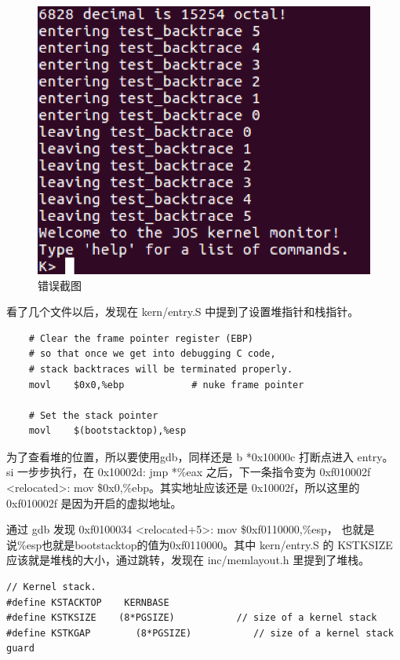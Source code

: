 \begin{ExerciseList}
\begin{figure}[H]
  \centering
  \includegraphics[width=6in]{figures/lab1/printf.png}
  \caption{错误截图}\label{fig:lab1:printf}
\end{figure}


看了几个文件以后，发现在 kern/entry.S 中提到了设置堆指针和栈指针。

\begin{verbatim}
    # Clear the frame pointer register (EBP)
    # so that once we get into debugging C code,
    # stack backtraces will be terminated properly.
    movl    $0x0,%ebp            # nuke frame pointer

    # Set the stack pointer
    movl    $(bootstacktop),%esp
\end{verbatim}

为了查看堆的位置，所以要使用gdb，同样还是 b *0x10000c 打断点进入 entry。 si 一步步执行，在 0x10002d: jmp *\%eax 之后，下一条指令变为 0xf010002f <relocated>: mov \$0x0,\%ebp。其实地址应该还是 0x10002f，所以这里的 0xf010002f 是因为开启的虚拟地址。

通过 gdb 发现 0xf0100034 <relocated+5>: mov \$0xf0110000,\%esp， 也就是说\%esp也就是bootstacktop的值为0xf0110000。其中 kern/entry.S 的 KSTKSIZE 应该就是堆栈的大小，通过跳转，发现在 inc/memlayout.h 里提到了堆栈。

\begin{verbatim}
// Kernel stack.
#define KSTACKTOP    KERNBASE
#define KSTKSIZE    (8*PGSIZE)           // size of a kernel stack
#define KSTKGAP        (8*PGSIZE)           // size of a kernel stack guard
\end{verbatim}


\end{ExerciseList}

